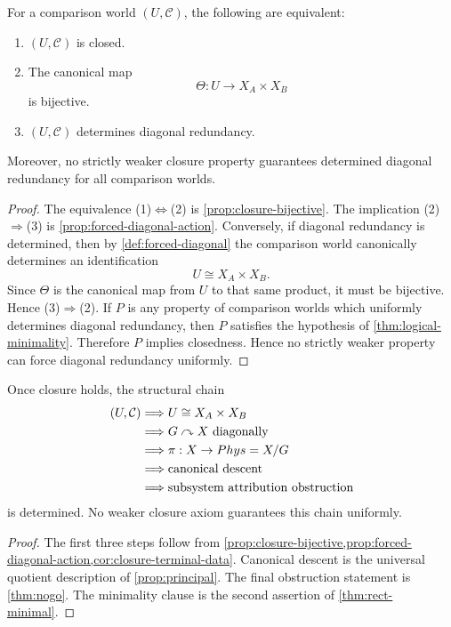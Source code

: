 \begin{theorem}
	\label{thm:rect-minimal}
	For a comparison world \((U,\mathcal C)\), the following are equivalent:
	\begin{enumerate}[label=\textup{(\arabic*)}]
		\item \((U,\mathcal C)\) is closed.
		\item The canonical map
		      \[
			      \Theta:U\to X_A\times X_B
		      \]
		      is bijective.
		\item \((U,\mathcal C)\) determines diagonal redundancy.
	\end{enumerate}
	Moreover, no strictly weaker closure property guarantees determined diagonal
	redundancy for all comparison worlds.
\end{theorem}
\begin{proof}
	The equivalence
	\textup{(1)}\(\Longleftrightarrow\)\textup{(2)} is
	\cref{prop:closure-bijective}. The implication
	\textup{(2)}\(\Longrightarrow\)\textup{(3)} is
	\cref{prop:forced-diagonal-action}. Conversely, if diagonal redundancy is
	determined, then by \cref{def:forced-diagonal} the comparison world
	canonically determines an identification
	\[
		U\cong X_A\times X_B.
	\]
	Since \(\Theta\) is the canonical map from \(U\) to that same product,
	it must be bijective. Hence
	\textup{(3)}\(\Longrightarrow\)\textup{(2)}.
	If \(P\) is any property of comparison worlds which uniformly determines
	diagonal redundancy, then \(P\) satisfies the hypothesis of
	\cref{thm:logical-minimality}. Therefore \(P\) implies closedness. Hence
	no strictly weaker property can force diagonal redundancy uniformly.
\end{proof}
\begin{corollary}
	Once closure holds, the structural chain
	\begin{align*}
		(U,\mathcal C)
		 & \Longrightarrow U\cong X_A\times X_B                     \\
		 & \Longrightarrow G\curvearrowright X \text{ diagonally}   \\
		 & \Longrightarrow \pi:X\to Phys=X/G                        \\
		 & \Longrightarrow \text{canonical descent}                    \\
		 & \Longrightarrow \text{subsystem attribution obstruction}
	\end{align*}
	is determined. No weaker closure axiom guarantees this chain uniformly.
\end{corollary}
\begin{proof}
	The first three steps follow from
	\cref{prop:closure-bijective,prop:forced-diagonal-action,cor:closure-terminal-data}.
	Canonical descent is the universal quotient description of
	\cref{prop:principal}. The final obstruction statement is
	\cref{thm:nogo}. The minimality clause is the second assertion of
	\cref{thm:rect-minimal}.
\end{proof}
